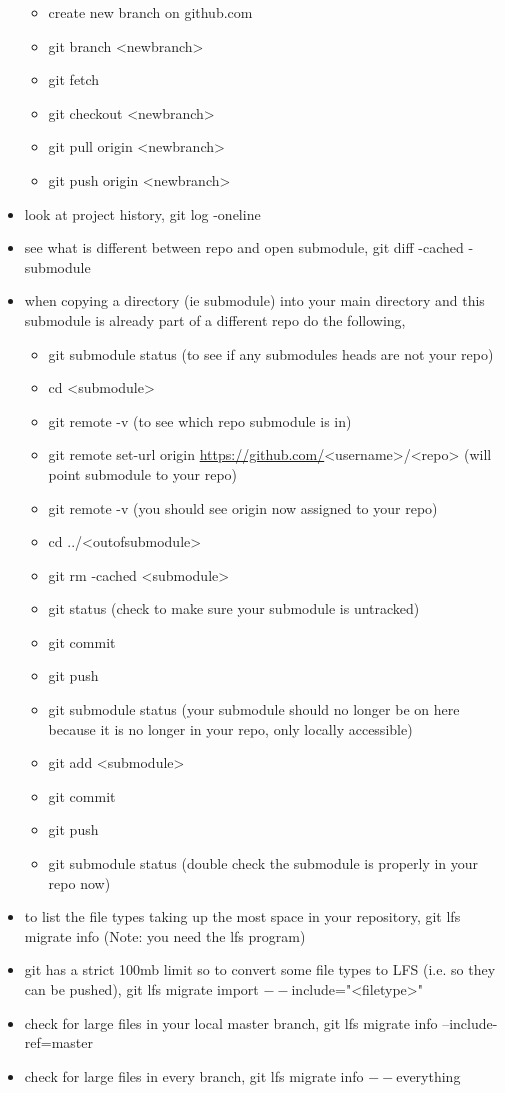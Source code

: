 \documentclass[11pt]{article}
\begin{document}
\begin{itemize}
\begin{itemize}
\item create new branch on github.com
\item git branch <newbranch>
\item git fetch
\item git checkout <newbranch>
\item git pull origin <newbranch>
\item git push origin <newbranch>
\end{itemize}
\item look at project history, git log -oneline
\item see what is different between repo and open submodule, git diff -cached -submodule
\item when copying a directory (ie submodule) into your main directory and this submodule is already part of a different repo do the following,
\begin{itemize}
\item git submodule status (to see if any submodules heads are not your repo)
\item cd <submodule>
\item git remote -v (to see which repo submodule is in)
\item git remote set-url origin \url{https://github.com/}<username>/<repo> (will point submodule to your repo)
\item git remote -v (you should see origin now assigned to your repo)
\item cd ../<outofsubmodule>
\item git rm -cached <submodule>
\item git status (check to make sure your submodule is untracked)
\item git commit
\item git push
\item git submodule status (your submodule should no longer be on here because it is no longer in your repo, only locally accessible)
\item git add <submodule>
\item git commit
\item git push
\item git submodule status (double check the submodule is properly in your repo now)
\end{itemize}
\item to list the file types taking up the most space in your repository, git lfs migrate info (Note: you need the lfs program)
\item git has a strict 100mb limit so to convert some file types to LFS (i.e. so they can be pushed), git lfs migrate import \(--\)include="<filetype>"
\item check for large files in your local master branch, git lfs migrate info --include-ref=master
\item check for large files in every branch, git lfs migrate info \(--\)everything
\end{itemize}
\end{document}
